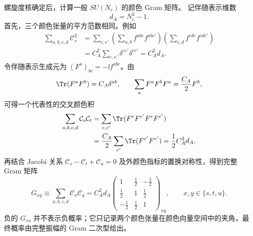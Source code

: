 \begin{derivation}
螺旋度核确定后，计算一般 $SU(N_c)$ 的颜色 Gram 矩阵。
记伴随表示维数
\begin{equation*}
 d_A=N_c^2-1.
\end{equation*}
首先，三个颜色张量的平方范数相同。例如
\begin{align*}
 \sum_{a,b,c,d}\mathcal C_s^2
 &=\sum_{e,e'}
 \left(\sum_{a,b}f^{abe}f^{ab e'}\right)
 \left(\sum_{c,d}f^{cde}f^{cd e'}\right)\\
 &=C_A^2\sum_{e,e'}\delta^{ee'}\delta^{ee'}
 =C_A^2d_A.
\end{align*}
令伴随表示生成元为 $(F^a)_{bc}=-\ii f^{abc}$。由
\begin{equation*}
 \Tr(F^aF^b)=C_A\delta^{ab},
 \qquad
 \sum_aF^aF^bF^a=\frac{C_A}{2}F^b,
\end{equation*}
可得一个代表性的交叉颜色积
\begin{align*}
 \sum_{a,b,c,d}\mathcal C_s\mathcal C_t
 &=\sum_{e,e'}\Tr(F^eF^{e'}F^eF^{e'})\\
 &=\frac{C_A}{2}\sum_{e'}\Tr(F^{e'}F^{e'})
 =\frac12C_A^2d_A.
\end{align*}
再结合 Jacobi 关系 $\mathcal C_s-\mathcal C_t+\mathcal C_u=0$ 及外颜色指标的置换对称性，得到完整 Gram 矩阵
\begin{equation*}
 G_{xy}\equiv\sum_{a,b,c,d}\mathcal C_x\mathcal C_y
 =C_A^2d_A
 \begin{pmatrix}
 1&\tfrac12&-\tfrac12\\
 \tfrac12&1&\tfrac12\\
 -\tfrac12&\tfrac12&1
 \end{pmatrix}_{xy},
 \qquad x,y\in\{s,t,u\}.
\end{equation*}
负的 $G_{su}$ 并不表示负概率；它只记录两个颜色张量在颜色向量空间中的夹角，最终概率由完整振幅的 Gram 二次型给出。


\end{derivation}
